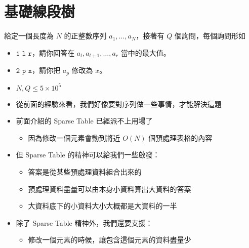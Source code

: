 \documentclass[standalone]{beamer}
\begin{document}
\section{基礎線段樹}

\begin{frame}{}
  \begin{problem}
    給定一個長度為 \(N\) 的正整數序列 \(a_1, \dots, a_N\)，接著有 \(Q\) 個詢問，每個詢問形如
    \begin{itemize}
        \item
            \(\texttt{1 l r}\)，請你回答在 \(a_l, a_{l+1}, \dots, a_{r}\) 當中的最大值。
        \item
            \(\texttt{2 p x}\)，請你把 \(a_p\) 修改為 \(x\)。
    \end{itemize}
    
    \begin{itemize}
        \item
            \(N, Q \leq 5 \times 10^5\)
    \end{itemize}
  \end{problem}
\end{frame}

\begin{frame}{}
  \begin{itemize}
    \item 從前面的經驗來看，我們好像要對序列做一些事情，才能解決這題
    \item 前面介紹的 Sparse Table 已經派不上用場了
    \begin{itemize}
      \item 因為修改一個元素會動到將近 $O(N)$ 個預處理表格的內容 
    \end{itemize}
    \item 但 Sparse Table 的精神可以給我們一些啟發：
    \begin{itemize}
      \item 答案是從某些預處理資料組合出來的
      \item 預處理資料盡量可以由本身小資料算出大資料的答案
      \item 大資料底下的小資料大小大概都是大資料的一半
    \end{itemize}
    \item 除了 Sparse Table 精神外，我們還要支援：
    \begin{itemize}
      \item 修改一個元素的時候，讓包含這個元素的資料盡量少
    \end{itemize}
  \end{itemize}
\end{frame}
\end{document}
